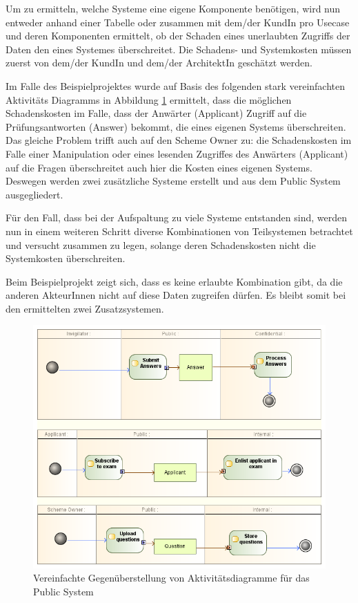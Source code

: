 Um zu ermitteln, welche Systeme eine eigene Komponente benötigen, wird nun entweder anhand einer Tabelle oder zusammen mit dem/der KundIn pro Usecase und deren Komponenten ermittelt, ob der Schaden eines unerlaubten Zugriffs der Daten den eines Systemes überschreitet. Die Schadens- und Systemkosten müssen zuerst von dem/der KundIn und dem/der ArchitektIn geschätzt werden.

Im Falle des Beispielprojektes wurde auf Basis des folgenden stark vereinfachten Aktivitäts Diagramms in Abbildung \ref{fig:actorarch} ermittelt, dass die möglichen Schadenskosten im Falle, dass der Anwärter (Applicant) Zugriff auf die Prüfungsantworten (Answer) bekommt, die eines eigenen Systems überschreiten. Das gleiche Problem trifft auch auf den Scheme Owner zu: die Schadenskosten im Falle einer Manipulation oder eines lesenden Zugriffes des Anwärters (Applicant) auf die Fragen überschreitet auch hier die Kosten eines eigenen Systems. Deswegen werden zwei zusätzliche Systeme erstellt und aus dem Public System ausgegliedert.

Für den Fall, dass bei der Aufspaltung zu viele Systeme entstanden sind, werden nun in einem weiteren Schritt diverse Kombinationen von Teilsystemen betrachtet und versucht zusammen zu legen, solange deren Schadenskosten nicht die Systemkosten überschreiten.

Beim Beispielprojekt zeigt sich, dass es keine erlaubte Kombination gibt, da die anderen AkteurInnen nicht auf diese Daten zugreifen dürfen. Es bleibt somit bei den ermittelten zwei Zusatzsystemen.

\begin{figure}[H]
    \centering
    \includegraphics[scale=0.6]{uml/actorarch.png}
    \caption{Vereinfachte Gegenüberstellung von Aktivitätsdiagramme für das Public System}
    \label{fig:actorarch}
\end{figure}

